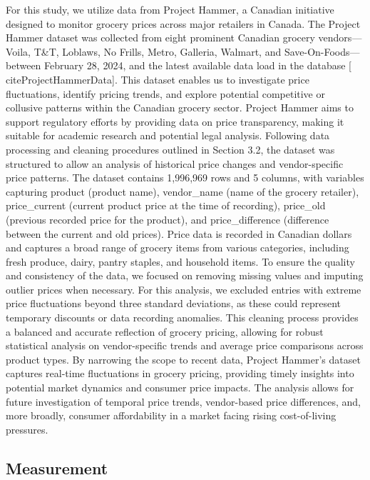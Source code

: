 \documentclass[
  letterpaper,
  DIV=11,
  numbers=noendperiod]{scrartcl}
\begin{document}
For this study, we utilize data from Project Hammer, a Canadian
initiative designed to monitor grocery prices across major retailers in
Canada. The Project Hammer dataset was collected from eight prominent
Canadian grocery vendors---Voila, T\&T, Loblaws, No Frills, Metro,
Galleria, Walmart, and Save-On-Foods---between February 28, 2024, and
the latest available data load in the database {[}
citeProjectHammerData{]}. This dataset enables us to investigate price
fluctuations, identify pricing trends, and explore potential competitive
or collusive patterns within the Canadian grocery sector. Project Hammer
aims to support regulatory efforts by providing data on price
transparency, making it suitable for academic research and potential
legal analysis. Following data processing and cleaning procedures
outlined in Section 3.2, the dataset was structured to allow an analysis
of historical price changes and vendor-specific price patterns. The
dataset contains 1,996,969 rows and 5 columns, with variables capturing
product (product name), vendor\_name (name of the grocery retailer),
price\_current (current product price at the time of recording),
price\_old (previous recorded price for the product), and
price\_difference (difference between the current and old prices). Price
data is recorded in Canadian dollars and captures a broad range of
grocery items from various categories, including fresh produce, dairy,
pantry staples, and household items. To ensure the quality and
consistency of the data, we focused on removing missing values and
imputing outlier prices when necessary. For this analysis, we excluded
entries with extreme price fluctuations beyond three standard
deviations, as these could represent temporary discounts or data
recording anomalies. This cleaning process provides a balanced and
accurate reflection of grocery pricing, allowing for robust statistical
analysis on vendor-specific trends and average price comparisons across
product types. By narrowing the scope to recent data, Project Hammer's
dataset captures real-time fluctuations in grocery pricing, providing
timely insights into potential market dynamics and consumer price
impacts. The analysis allows for future investigation of temporal price
trends, vendor-based price differences, and, more broadly, consumer
affordability in a market facing rising cost-of-living pressures.

\subsection{Measurement}\label{measurement}
\end{document}
